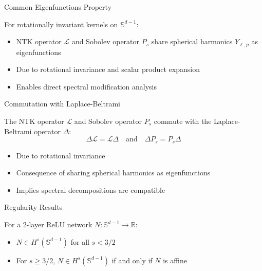 \documentclass{beamer}
\newcommand{\R}{\mathbb{R}}
\newcommand{\Sd}{\mathbb{S}^{d-1}}
\newcommand{\Lap}{\Delta}
\begin{document}
\begin{frame}{Common Eigenfunctions Property}
\begin{theorem}
For rotationally invariant kernels on $\mathbb{S}^{d-1}$:
\begin{itemize}
\item NTK operator $\mathcal{L}$ and Sobolev operator $P_s$ share spherical harmonics $Y_{\ell,p}$ as eigenfunctions
\item Due to rotational invariance and scalar product expansion
\item Enables direct spectral modification analysis
\end{itemize}
\end{theorem}
\end{frame}

\begin{frame}{Commutation with Laplace-Beltrami}
\begin{theorem}
The NTK operator $\mathcal{L}$ and Sobolev operator $P_s$ commute with the Laplace-Beltrami operator $\Lap$:
\[ \Lap \mathcal{L} = \mathcal{L} \Lap \quad \text{and} \quad \Lap P_s = P_s \Lap \]
\begin{itemize}
\item Due to rotational invariance
\item Consequence of sharing spherical harmonics as eigenfunctions
\item Implies spectral decompositions are compatible
\end{itemize}
\end{theorem}
\end{frame}



\begin{frame}{Regularity Results}
\begin{theorem}
For a 2-layer ReLU network $N: \Sd \to \R$:
\begin{itemize}
\item $N \in H^s(\Sd)$ for all $s < 3/2$
\item For $s \geq 3/2$, $N \in H^s(\Sd)$ if and only if $N$ is affine
\end{itemize}
\end{theorem}
\end{frame}
\end{document}
